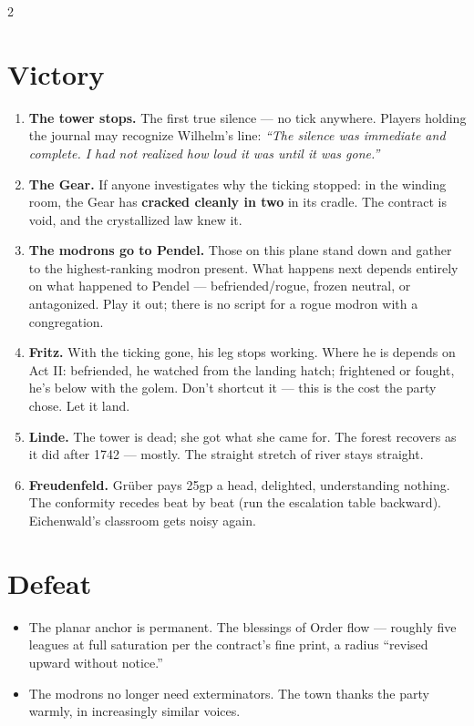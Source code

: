 \documentclass[10pt,letterpaper]{article}
\begin{document}
\begin{multicols}{2}

\section*{Victory}
\begin{enumerate}
\item \textbf{The tower stops.} The first true silence --- no tick anywhere. Players holding the journal may recognize Wilhelm's line: \textit{``The silence was immediate and complete. I had not realized how loud it was until it was gone.''}
\item \textbf{The Gear.} If anyone investigates why the ticking stopped: in the winding room, the Gear has \textbf{cracked cleanly in two} in its cradle. The contract is void, and the crystallized law knew it.
\item \textbf{The modrons go to Pendel.} Those on this plane stand down and gather to the highest-ranking modron present. What happens next depends entirely on what happened to Pendel --- befriended/rogue, frozen neutral, or antagonized. Play it out; there is no script for a rogue modron with a congregation.
\item \textbf{Fritz.} With the ticking gone, his leg stops working. Where he is depends on Act II: befriended, he watched from the landing hatch; frightened or fought, he's below with the golem. Don't shortcut it --- this is the cost the party chose. Let it land.
\item \textbf{Linde.} The tower is dead; she got what she came for. The forest recovers as it did after 1742 --- mostly. The straight stretch of river stays straight.
\item \textbf{Freudenfeld.} Grüber pays 25gp a head, delighted, understanding nothing. The conformity recedes beat by beat (run the escalation table backward). Eichenwald's classroom gets noisy again.
\end{enumerate}

\columnbreak

\section*{Defeat}
\begin{itemize}
\item The planar anchor is permanent. The blessings of Order flow --- roughly five leagues at full saturation per the contract's fine print, a radius ``revised upward without notice.''
\item The modrons no longer need exterminators. The town thanks the party warmly, in increasingly similar voices.
\end{itemize}


\end{multicols}
\end{document}
